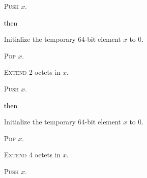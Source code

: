 \documentclass[a4paper,12pt]{article}
\newcommand{\num}[1]{\texttt{#1}}
\newcommand{\hex}[1]{\num{#1}_{\textup{\tiny 16}}}
\newcommand{\proc}[1]{\textsc{#1}}
\newcommand{\op}[1]{$#1$}
\theoremstyle{definition}
\newcommand{\SIGXS}     [1]{\op{\hex{0D}}}
\newcommand{\SIGXI}     [1]{\op{\hex{0E}}}
\begin{document}
\begin{stepnumbers}[start=3]
\begin{description}
\begin{stepnumbers}
    \item \proc{Push} $x$.
    \end{stepnumbers}
  \item[\SIGXS{}] then
    \begin{stepnumbers}
    \item Initialize the temporary 64-bit element $x$ to 0.
    \item \proc{Pop} $x$.
    \item \proc{Extend} 2 octets in $x$.
    \item \proc{Push} $x$.
    \end{stepnumbers}
  \item[\SIGXI{}] then
    \begin{stepnumbers}
    \item Initialize the temporary 64-bit element $x$ to 0.
    \item \proc{Pop} $x$.
    \item \proc{Extend} 4 octets in $x$.
    \item \proc{Push} $x$.
    \end{stepnumbers}
  \end{description}
\end{stepnumbers}
\end{document}
